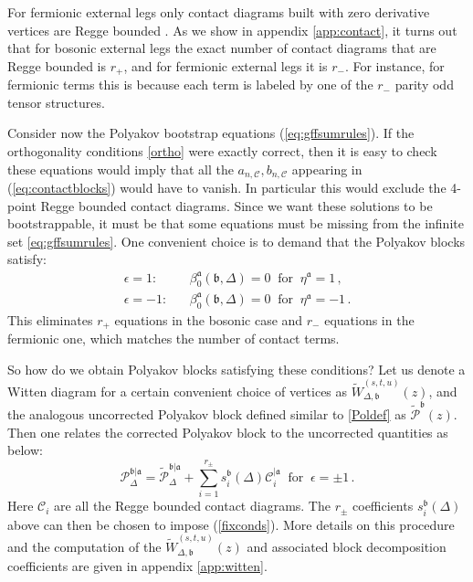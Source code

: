 \documentclass[12pt]{article}
\numberwithin{equation}{section}
\newcommand{\reef}[1]{(\ref{#1})}
\newcommand{\be}{\begin{equation}}
\newcommand{\ee}{\end{equation}}
\newcommand{\AK}[1]{{\color{red} \bf [[AK: #1]]}}
\def\e{\epsilon}
\def\b{\beta}
\def\D{\Delta}
\newcommand{\mf}[1]{\mathfrak #1}
\begin{document}
	For fermionic external legs only contact diagrams built  with zero derivative vertices are Regge bounded \cite{Mazac:2018qmi,Mazac:2018ycv}. As we show in appendix \ref{app:contact}, it turns out that for bosonic external legs the exact number of contact diagrams that are Regge bounded is $r_+$, and for fermionic external legs it is $r_-$. For instance, for fermionic terms this is because each term is labeled by one of the $r_-$ parity odd tensor structures. 
	
	Consider now the Polyakov bootstrap equations \reef{eq:gffsumrules}. If the orthogonality conditions \eqref{ortho} were exactly correct, then it is easy to check these equations would imply that all the $a_{n,\mathcal C}, b_{n,\mathcal C}$ appearing in \reef{eq:contactblocks} would have to vanish. In particular this would exclude the 4-point Regge bounded contact diagrams. Since we want these solutions to be bootstrappable, it must be that some equations must be missing from the infinite set \eqref{eq:gffsumrules}. One convenient choice is to demand that the Polyakov blocks satisfy:
	\begin{align}\label{fixconds}
	\e=1: \ \ \ \ &\b_0^{\mf a}(\mf b,\D)=0 \ \text{ for } \  \eta^{\mf a}=1\,,\nonumber\\
	\e=-1: \ \ \ \ &\b_0^{\mf a}(\mf b,\D)=0 \  \text{ for } \ \eta^{\mf a}=-1\,.
	\end{align}
	This eliminates $r_+$ equations in the bosonic case and $r_-$ equations in the fermionic one, which matches the number of contact terms. 
	
	So how do we obtain Polyakov blocks satisfying these conditions? Let us denote a Witten diagram for a certain convenient choice of vertices as $\widetilde W^{(s,t,u)}_{\D,\mf b}(z)$, and the analogous uncorrected Polyakov block defined similar to \eqref{Poldef} as $\widetilde{\mathcal P}^{\mf b}(z)$.
	Then one relates the corrected Polyakov block to the uncorrected quantities as below:
	\be
	\mathcal{P}^{\mf b|\mf a}_{\Delta} = \widetilde{\mathcal{P}}^{\mf b|\mf a}_{\Delta}+\sum_{i=1}^{r_{\pm}} s_i^{\mf b}(\Delta) \mathcal{C}_{i}^{|\mf a} \  \text{ for } \ \e=\pm 1\,.
	\ee
	Here $\mathcal{C}_{i}$ are all the Regge bounded contact diagrams. The $r_{\pm}$ coefficients $s_i^{\mf b}(\Delta)$ above can then be chosen to impose \reef{fixconds}. More details on this procedure and the computation of the $\widetilde{W}^{(s,t,u)}_{\D,\mf b}(z)$ and associated block decomposition coefficients are given in appendix \ref{app:witten}.
	
\end{document}
